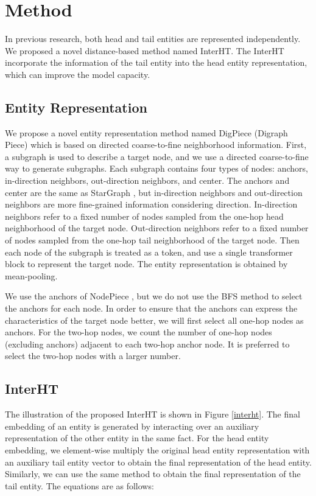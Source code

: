 \documentclass[11pt]{article}
\begin{document}
\section{Method}
In previous research, both head and tail entities are represented independently. We proposed a novel distance-based method named InterHT. The InterHT incorporate the information of the tail entity into the head entity representation, which can improve the model capacity.
\subsection{Entity Representation}
We propose a novel entity representation method named DigPiece (Digraph Piece) which is based on directed coarse-to-fine neighborhood information. First, a subgraph is used to describe a target node, and we use a directed coarse-to-fine way to generate subgraphs. Each subgraph contains four types of nodes: anchors, in-direction neighbors, out-direction neighbors, and center. The anchors and center are the same as StarGraph \cite{li2022stargraph}, but in-direction neighbors and out-direction neighbors are more fine-grained information considering direction. In-direction neighbors refer to a fixed number of nodes sampled from the one-hop head neighborhood of the target node. Out-direction neighbors refer to a fixed number of nodes sampled from the one-hop tail neighborhood of the target node. Then each node of the subgraph is treated as a token, and use a single transformer block to represent the target node. The entity representation is obtained by mean-pooling.

 We use the anchors of NodePiece \cite{galkin2021nodepiece}, but we do not use the BFS method to select the anchors for each node. In order to ensure that the anchors can express the characteristics of the target node better, we will first select all one-hop nodes as anchors. For the two-hop nodes, we count the number of one-hop nodes (excluding anchors) adjacent to each two-hop anchor node. It is preferred to select the two-hop nodes with a larger number.
\subsection{InterHT}
The illustration of the proposed InterHT is shown in Figure \ref{interht}. The final embedding of an entity is generated by interacting over an auxiliary representation of the other entity in the same fact. For the head entity embedding, we element-wise multiply the original head entity representation with an auxiliary tail entity vector to obtain the final representation of the head entity. Similarly, we can use the same method to obtain the final representation of the tail entity. The equations are as follows:
\end{document}
